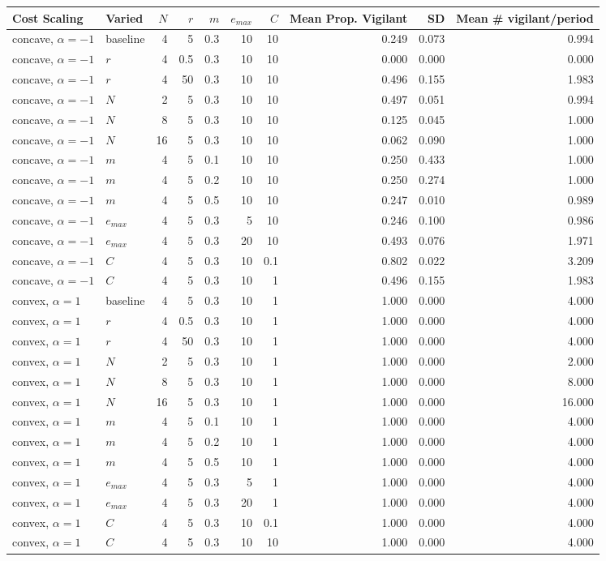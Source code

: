 \begin{tabular}{ll|rrrrr|rrr}
\toprule
Cost Scaling & Varied & $N$ & $r$ & $m$ & $e_{max}$ & $C$ & Mean Prop. Vigilant & SD & Mean \# vigilant/period \\
\midrule
concave, $\alpha=-1$ & baseline & 4 & 5 & 0.3 & 10 & 10 & 0.249 & 0.073 & 0.994 \\
concave, $\alpha=-1$ & $r$ & 4 & 0.5 & 0.3 & 10 & 10 & 0.000 & 0.000 & 0.000 \\
concave, $\alpha=-1$ & $r$ & 4 & 50 & 0.3 & 10 & 10 & 0.496 & 0.155 & 1.983 \\
concave, $\alpha=-1$ & $N$ & 2 & 5 & 0.3 & 10 & 10 & 0.497 & 0.051 & 0.994 \\
concave, $\alpha=-1$ & $N$ & 8 & 5 & 0.3 & 10 & 10 & 0.125 & 0.045 & 1.000 \\
concave, $\alpha=-1$ & $N$ & 16 & 5 & 0.3 & 10 & 10 & 0.062 & 0.090 & 1.000 \\
concave, $\alpha=-1$ & $m$ & 4 & 5 & 0.1 & 10 & 10 & 0.250 & 0.433 & 1.000 \\
concave, $\alpha=-1$ & $m$ & 4 & 5 & 0.2 & 10 & 10 & 0.250 & 0.274 & 1.000 \\
concave, $\alpha=-1$ & $m$ & 4 & 5 & 0.5 & 10 & 10 & 0.247 & 0.010 & 0.989 \\
concave, $\alpha=-1$ & $e_{max}$ & 4 & 5 & 0.3 & 5 & 10 & 0.246 & 0.100 & 0.986 \\
concave, $\alpha=-1$ & $e_{max}$ & 4 & 5 & 0.3 & 20 & 10 & 0.493 & 0.076 & 1.971 \\
concave, $\alpha=-1$ & $C$ & 4 & 5 & 0.3 & 10 & 0.1 & 0.802 & 0.022 & 3.209 \\
concave, $\alpha=-1$ & $C$ & 4 & 5 & 0.3 & 10 & 1 & 0.496 & 0.155 & 1.983 \\
\midrule
convex, $\alpha=1$ & baseline & 4 & 5 & 0.3 & 10 & 1 & 1.000 & 0.000 & 4.000 \\
convex, $\alpha=1$ & $r$ & 4 & 0.5 & 0.3 & 10 & 1 & 1.000 & 0.000 & 4.000 \\
convex, $\alpha=1$ & $r$ & 4 & 50 & 0.3 & 10 & 1 & 1.000 & 0.000 & 4.000 \\
convex, $\alpha=1$ & $N$ & 2 & 5 & 0.3 & 10 & 1 & 1.000 & 0.000 & 2.000 \\
convex, $\alpha=1$ & $N$ & 8 & 5 & 0.3 & 10 & 1 & 1.000 & 0.000 & 8.000 \\
convex, $\alpha=1$ & $N$ & 16 & 5 & 0.3 & 10 & 1 & 1.000 & 0.000 & 16.000 \\
convex, $\alpha=1$ & $m$ & 4 & 5 & 0.1 & 10 & 1 & 1.000 & 0.000 & 4.000 \\
convex, $\alpha=1$ & $m$ & 4 & 5 & 0.2 & 10 & 1 & 1.000 & 0.000 & 4.000 \\
convex, $\alpha=1$ & $m$ & 4 & 5 & 0.5 & 10 & 1 & 1.000 & 0.000 & 4.000 \\
convex, $\alpha=1$ & $e_{max}$ & 4 & 5 & 0.3 & 5 & 1 & 1.000 & 0.000 & 4.000 \\
convex, $\alpha=1$ & $e_{max}$ & 4 & 5 & 0.3 & 20 & 1 & 1.000 & 0.000 & 4.000 \\
convex, $\alpha=1$ & $C$ & 4 & 5 & 0.3 & 10 & 0.1 & 1.000 & 0.000 & 4.000 \\
convex, $\alpha=1$ & $C$ & 4 & 5 & 0.3 & 10 & 10 & 1.000 & 0.000 & 4.000 \\
\bottomrule
\end{tabular}